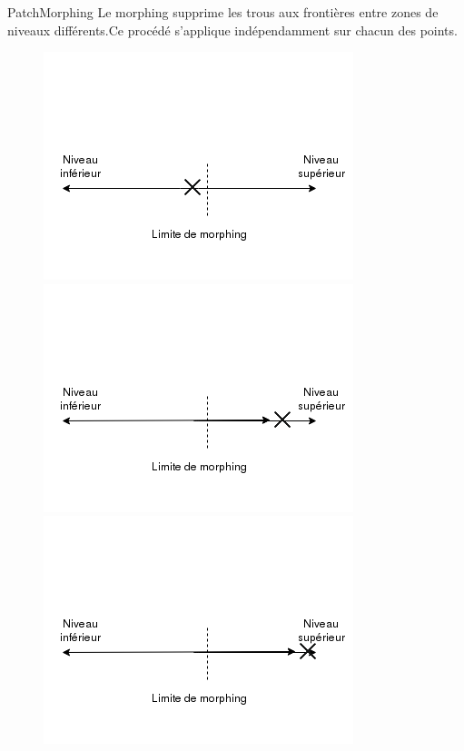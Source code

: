 \documentclass[french]{beamer}
\begin{document}
 
 \begin{frame}{Patch}{Morphing}
 Le morphing supprime les trous aux frontières entre zones de niveaux différents.Ce procédé s'applique indépendamment sur chacun des points.
 \begin{figure}[!b]
\centerline{
   \includegraphics[scale=0.35]{img/morphing1.png}
   \includegraphics[scale=0.35]{img/morphing2.png}
   \includegraphics[scale=0.35]{img/morphing3.png}
   }
   \centerline{
}
\end{figure}
\end{frame}
\end{document}
